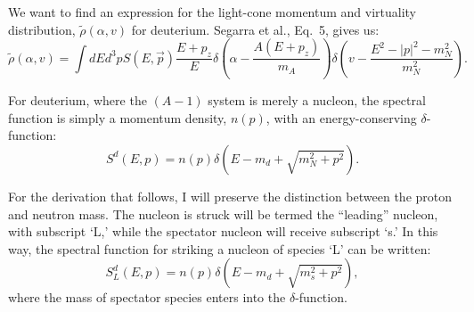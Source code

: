 \documentclass{article}
\begin{document}
We want to find an expression for the light-cone momentum and virtuality distribution, $\tilde{\rho}(\alpha,v)$ for deuterium.
  Segarra et al., Eq.~5, gives us:
  \begin{equation}
    \tilde{\rho}(\alpha,v) = \int dE d^3p S(E,\vec{p}) \frac{E+p_z}{E} \delta\left( \alpha - \frac{A(E+p_z)}{m_A}\right)
    \delta\left( v - \frac{E^2 - |p|^2 - m_N^2}{m_N^2}\right).
    \label{eq:setup}
  \end{equation}

  For deuterium, where the $(A-1)$ system is merely a nucleon, the spectral function is simply a momentum density, $n(p)$, with an
  energy-conserving $\delta$-function:
  \begin{equation}
    S^d(E,p) = n(p) \delta\left(E - m_d + \sqrt{m_N^2 + p^2}\right).
  \end{equation}

  For the derivation that follows, I will preserve the distinction between the proton and neutron mass. The nucleon is struck
  will be termed the ``leading'' nucleon, with subscript `L,' while the spectator nucleon will receive subscript `s.' In this
  way, the spectral function for striking a nucleon of species `L' can be written:
  \begin{equation}
    S_L^d(E,p) = n(p) \delta\left(E - m_d + \sqrt{m_s^2 + p^2}\right),
  \end{equation}
  where the mass of spectator species enters into the $\delta$-function.
\end{document}
